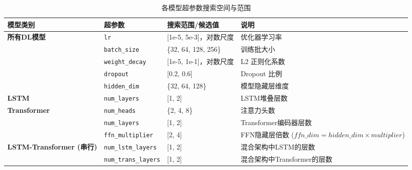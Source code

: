 \documentclass[UTF8,AutoFakeBold=1,AutoFakeSlant,zihao=-4]{SCAU}
\begin{document}
\begin{table}[htbp]
  \centering
  \caption{各模型超参数搜索空间与范围}
  \label{tab:hp_search}
  \begin{tabularx}{\textwidth}{@{}lllX@{}}
    \toprule
    \textbf{模型类别}                    & \textbf{超参数}            & \textbf{搜索范围/候选值}        & \textbf{说明}                                           \\
    \midrule
    \multirow{5}{*}{\textbf{所有DL模型}} & \texttt{lr}                & [1e-5, 5e-3]，对数尺度 & 优化器学习率                                           \\
                                         & \texttt{batch\_size}      & \{32, 64, 128, 256\}   & 训练批大小                                             \\
                                         & \texttt{weight\_decay}    & [1e-5, 1e-1]，对数尺度 & L2 正则化系数                                          \\
                                         & \texttt{dropout}          & [0.2, 0.6]             & Dropout 比例                                           \\
                                         & \texttt{hidden\_dim}      & \{32, 64, 128\}        & 模型隐藏层维度                                         \\
    \midrule
    \textbf{LSTM}                        & \texttt{num\_layers}      & [1, 2]                 & LSTM堆叠层数                                           \\
    \midrule
    \multirow{3}{*}{\textbf{Transformer}} & \texttt{num\_heads}       & \{2, 4, 8\}            & 注意力头数                                             \\
                                         & \texttt{num\_layers}      & [1, 2]                 & Transformer编码器层数                                  \\
                                         & \texttt{ffn\_multiplier}  & [2, 4]                 & FFN隐藏层倍数 ($ffn\_dim = hidden\_dim \times multiplier$) \\
    \midrule
    \multirow{4}{*}{\textbf{LSTM-Transformer (串行)}} & \texttt{num\_lstm\_layers} & [1, 2]                 & 混合架构中LSTM的层数                                  \\
                                         & \texttt{num\_trans\_layers} & [1, 2]               & 混合架构中Transformer的层数                           \\

\end{tabularx}
\end{table}
\end{document}
